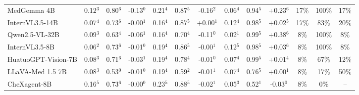 \documentclass{article}
\begin{document}
\begin{table}[t]
{\begin{tabular}{l@{\hspace{3pt}}ccc@{\hspace{4pt}}ccc@{\hspace{4pt}}ccc@{\hspace{4pt}}ccc}
MedGemma 4B & \cellcolor{cfSage3}0.12$^{3}$ & \cellcolor{cfSage3}0.80$^{6}$ & \cellcolor{cfSlate3}-0.13$^{0}$ & \cellcolor{cfSage4}0.21$^{4}$ & \cellcolor{cfSage3}0.87$^{5}$ & \cellcolor{cfSlate3}-0.16$^{2}$ & \cellcolor{cfSage2}0.06$^{4}$ & \cellcolor{cfSage4}0.94$^{5}$ & \cellcolor{cfTerra3}+0.23$^{6}$ & \cellcolor{cfTerra3}17\% & \cellcolor{cfTerra4}100\% & 17\% \\
InternVL3.5-14B & \cellcolor{cfSage2}0.07$^{4}$ & \cellcolor{cfSage2}0.73$^{6}$ & \cellcolor{cfSlate1}-0.00$^{1}$ & \cellcolor{cfSage3}0.16$^{4}$ & \cellcolor{cfSage3}0.87$^{5}$ & \cellcolor{cfTerra1}+0.00$^{1}$ & \cellcolor{cfSage3}0.12$^{4}$ & \cellcolor{cfSage4}0.98$^{5}$ & \cellcolor{cfTerra1}+0.02$^{5}$ & \cellcolor{cfTerra3}17\% & \cellcolor{cfTerra3}83\% & 20\% \\
Qwen2.5-VL-32B & \cellcolor{cfSage2}0.09$^{3}$ & \cellcolor{cfSage2}0.63$^{4}$ & \cellcolor{cfSlate2}-0.06$^{1}$ & \cellcolor{cfSage3}0.16$^{4}$ & \cellcolor{cfSage2}0.70$^{4}$ & \cellcolor{cfSlate3}-0.11$^{0}$ & \cellcolor{cfSage1}0.02$^{1}$ & \cellcolor{cfSage4}0.99$^{5}$ & \cellcolor{cfTerra4}+0.38$^{6}$ & \cellcolor{cfTerra2}8\% & \cellcolor{cfTerra4}100\% & 8\% \\
InternVL3.5-8B & \cellcolor{cfSage2}0.06$^{2}$ & \cellcolor{cfSage2}0.73$^{6}$ & \cellcolor{cfSlate1}-0.01$^{0}$ & \cellcolor{cfSage3}0.19$^{4}$ & \cellcolor{cfSage3}0.86$^{5}$ & \cellcolor{cfSlate1}-0.00$^{1}$ & \cellcolor{cfSage2}0.12$^{5}$ & \cellcolor{cfSage4}0.98$^{5}$ & \cellcolor{cfTerra2}+0.03$^{6}$ & \cellcolor{cfTerra2}8\% & \cellcolor{cfTerra4}100\% & 8\% \\
HuatuoGPT-Vision-7B & \cellcolor{cfSage2}0.08$^{3}$ & \cellcolor{cfSage2}0.71$^{6}$ & \cellcolor{cfSlate2}-0.03$^{1}$ & \cellcolor{cfSage3}0.19$^{4}$ & \cellcolor{cfSage3}0.78$^{4}$ & \cellcolor{cfSlate1}-0.01$^{0}$ & \cellcolor{cfSage2}0.07$^{4}$ & \cellcolor{cfSage4}0.99$^{5}$ & \cellcolor{cfTerra1}+0.01$^{4}$ & \cellcolor{cfTerra2}8\% & \cellcolor{cfTerra3}67\% & 12\% \\
LLaVA-Med 1.5 7B & \cellcolor{cfSage2}0.08$^{3}$ & \cellcolor{cfSage1}0.53$^{0}$ & \cellcolor{cfSlate1}-0.01$^{0}$ & \cellcolor{cfSage3}0.19$^{4}$ & \cellcolor{cfSage1}0.59$^{2}$ & \cellcolor{cfSlate1}-0.01$^{1}$ & \cellcolor{cfSage2}0.07$^{4}$ & \cellcolor{cfSage3}0.76$^{5}$ & \cellcolor{cfTerra1}+0.00$^{1}$ & \cellcolor{cfTerra2}8\% & \cellcolor{cfTerra2}17\% & 50\% \\
CheXagent-8B & \cellcolor{cfSage3}0.16$^{5}$ & \cellcolor{cfSage2}0.73$^{6}$ & \cellcolor{cfSlate1}-0.00$^{0}$ & \cellcolor{cfSage4}0.23$^{5}$ & \cellcolor{cfSage3}0.88$^{5}$ & \cellcolor{cfSlate1}-0.02$^{1}$ & \cellcolor{cfSage2}0.05$^{3}$ & \cellcolor{cfSage1}0.52$^{1}$ & \cellcolor{cfSlate2}-0.03$^{0}$ & \cellcolor{cfTerra2}8\% & \cellcolor{cfTerra1}0\% & -- \\

\end{tabular}}
\end{table}
\end{document}
